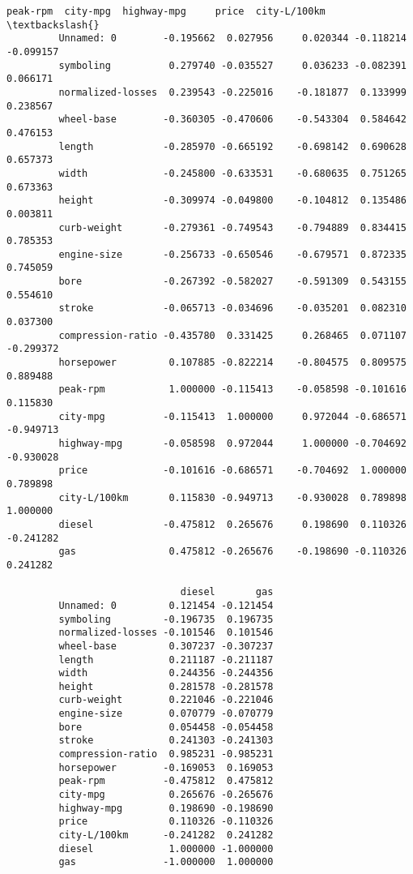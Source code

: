 \documentclass[11pt]{article}
\begin{document}
\begin{Verbatim}[commandchars=\\\{\}]
                            peak-rpm  city-mpg  highway-mpg     price  city-L/100km  \textbackslash{}
         Unnamed: 0        -0.195662  0.027956     0.020344 -0.118214     -0.099157   
         symboling          0.279740 -0.035527     0.036233 -0.082391      0.066171   
         normalized-losses  0.239543 -0.225016    -0.181877  0.133999      0.238567   
         wheel-base        -0.360305 -0.470606    -0.543304  0.584642      0.476153   
         length            -0.285970 -0.665192    -0.698142  0.690628      0.657373   
         width             -0.245800 -0.633531    -0.680635  0.751265      0.673363   
         height            -0.309974 -0.049800    -0.104812  0.135486      0.003811   
         curb-weight       -0.279361 -0.749543    -0.794889  0.834415      0.785353   
         engine-size       -0.256733 -0.650546    -0.679571  0.872335      0.745059   
         bore              -0.267392 -0.582027    -0.591309  0.543155      0.554610   
         stroke            -0.065713 -0.034696    -0.035201  0.082310      0.037300   
         compression-ratio -0.435780  0.331425     0.268465  0.071107     -0.299372   
         horsepower         0.107885 -0.822214    -0.804575  0.809575      0.889488   
         peak-rpm           1.000000 -0.115413    -0.058598 -0.101616      0.115830   
         city-mpg          -0.115413  1.000000     0.972044 -0.686571     -0.949713   
         highway-mpg       -0.058598  0.972044     1.000000 -0.704692     -0.930028   
         price             -0.101616 -0.686571    -0.704692  1.000000      0.789898   
         city-L/100km       0.115830 -0.949713    -0.930028  0.789898      1.000000   
         diesel            -0.475812  0.265676     0.198690  0.110326     -0.241282   
         gas                0.475812 -0.265676    -0.198690 -0.110326      0.241282   
         
                              diesel       gas  
         Unnamed: 0         0.121454 -0.121454  
         symboling         -0.196735  0.196735  
         normalized-losses -0.101546  0.101546  
         wheel-base         0.307237 -0.307237  
         length             0.211187 -0.211187  
         width              0.244356 -0.244356  
         height             0.281578 -0.281578  
         curb-weight        0.221046 -0.221046  
         engine-size        0.070779 -0.070779  
         bore               0.054458 -0.054458  
         stroke             0.241303 -0.241303  
         compression-ratio  0.985231 -0.985231  
         horsepower        -0.169053  0.169053  
         peak-rpm          -0.475812  0.475812  
         city-mpg           0.265676 -0.265676  
         highway-mpg        0.198690 -0.198690  
         price              0.110326 -0.110326  
         city-L/100km      -0.241282  0.241282  
         diesel             1.000000 -1.000000  
         gas               -1.000000  1.000000  
\end{Verbatim}
            
\end{document}
